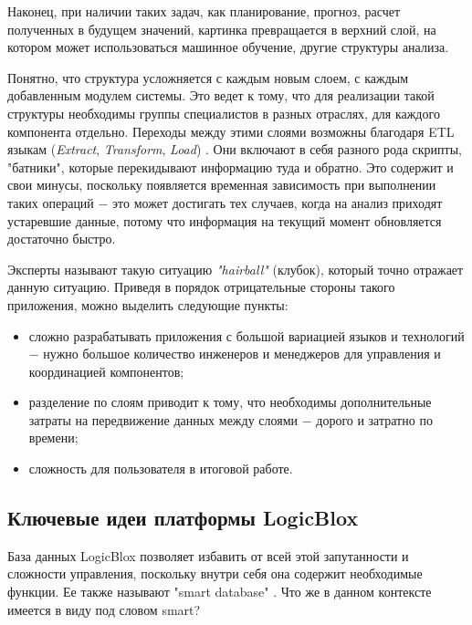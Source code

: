 Наконец, при наличии таких задач, как планирование, прогноз, расчет полученных в будущем значений, картинка превращается в верхний слой, на котором может использоваться машинное обучение, другие структуры анализа.

Понятно, что структура усложняется с каждым новым слоем, с каждым добавленным модулем системы. Это ведет к тому, что для реализации такой структуры необходимы группы специалистов в разных отраслях, для каждого компонента отдельно. Переходы между этими слоями возможны благодаря ETL языкам (\emph{Extract}, \emph{Transform}, \emph{Load}) \cite{etl_what_for}. Они включают в себя разного рода скрипты, "батники", которые перекидывают информацию туда и обратно. Это содержит и свои минусы, поскольку появляется временная зависимость при выполнении таких операций ​− это может достигать тех случаев, когда на анализ приходят устаревшие данные, потому что информация на текущий момент обновляется достаточно быстро.

Эксперты называют такую ситуацию \emph{"hairball"} (клубок), который точно отражает данную ситуацию. Приведя в порядок отрицательные стороны такого приложения, можно выделить следующие пункты:
\begin{itemize}
  \item сложно разрабатывать приложения с большой вариацией языков и технологий ​− нужно большое количество инженеров и менеджеров для управления и координацией компонентов;
  \item разделение по слоям приводит к тому, что необходимы дополнительные затраты на передвижение данных между слоями ​− дорого и затратно по времени;
  \item сложность для пользователя в итоговой работе.
\end{itemize}

\subsection{Ключевые идеи платформы LogicBlox}
\label{sec:domain:framework_key_ideas}

База данных LogicBlox позволяет избавить от всей этой запутанности и сложности управления, поскольку внутри себя она содержит необходимые функции. Ее также называют "smart database" \cite{kurt_lecture}. Что же в данном контексте имеется в виду под словом smart?

